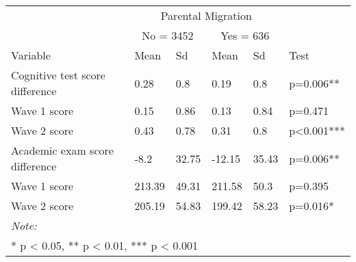 \documentclass[
  man,floatsintext]{apa7}
\begin{document}
\begin{tabular}{llllll}
\toprule
\multicolumn{1}{c}{ } & \multicolumn{4}{c}{Parental Migration} \\
\cmidrule(l{3pt}r{3pt}){2-5}
\multicolumn{1}{c}{ } & \multicolumn{2}{c}{No = 3452} & \multicolumn{2}{c}{Yes = 636} \\
\cmidrule(l{3pt}r{3pt}){2-3} \cmidrule(l{3pt}r{3pt}){4-5}
Variable & Mean & Sd & Mean & Sd & Test\\
\midrule
Cognitive test score difference & 0.28 & 0.8 & 0.19 & 0.8 & p=0.006**\\
\hspace{1em}Wave 1 score & 0.15 & 0.86 & 0.13 & 0.84 & p=0.471\\
\hspace{1em}Wave 2 score & 0.43 & 0.78 & 0.31 & 0.8 & p<0.001***\\
Academic exam score difference & -8.2 & 32.75 & -12.15 & 35.43 & p=0.006**\\
\hspace{1em}Wave 1 score & 213.39 & 49.31 & 211.58 & 50.3 & p=0.395\\
\addlinespace
\hspace{1em}Wave 2 score & 205.19 & 54.83 & 199.42 & 58.23 & p=0.016*\\
\bottomrule
\multicolumn{6}{l}{\rule{0pt}{1em}\textit{Note: }}\\
\multicolumn{6}{l}{\rule{0pt}{1em}* p < 0.05, ** p < 0.01, *** p < 0.001}\\
\end{tabular}

\newpage
\end{document}
